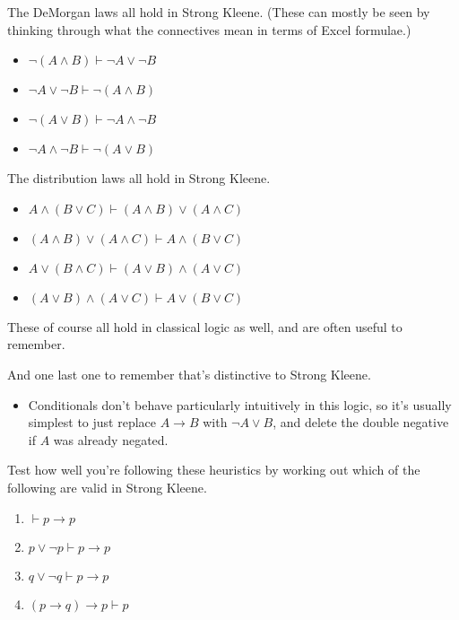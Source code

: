 \documentclass[
]{article}
\providecommand{\tightlist}{%
  \setlength{\itemsep}{0pt}\setlength{\parskip}{0pt}}\usepackage{longtable,booktabs,array}
\begin{document}
The DeMorgan laws all hold in Strong Kleene. (These can mostly be seen
by thinking through what the connectives mean in terms of Excel
formulae.)

\begin{itemize}
\tightlist
\item
  \(\neg (A \wedge B) \vdash \neg A \vee \neg B\)
\item
  \(\neg A \vee \neg B \vdash \neg (A \wedge B)\)
\item
  \(\neg (A \vee B) \vdash \neg A \wedge \neg B\)
\item
  \(\neg A \wedge \neg B \vdash \neg (A \vee B)\)
\end{itemize}

The distribution laws all hold in Strong Kleene.

\begin{itemize}
\tightlist
\item
  \(A \wedge (B \vee C) \vdash (A \wedge B) \vee (A \wedge C)\)
\item
  \((A \wedge B) \vee (A \wedge C) \vdash A \wedge (B \vee C)\)
\item
  \(A \vee (B \wedge C) \vdash (A \vee B) \wedge (A \vee C)\)
\item
  \((A \vee B) \wedge (A \vee C) \vdash A \vee (B \vee C)\)
\end{itemize}

These of course all hold in classical logic as well, and are often
useful to remember.

And one last one to remember that's distinctive to Strong Kleene.

\begin{itemize}
\tightlist
\item
  Conditionals don't behave particularly intuitively in this logic, so
  it's usually simplest to just replace \(A \rightarrow B\) with
  \(\neg A \vee B\), and delete the double negative if \(A\) was already
  negated.
\end{itemize}

Test how well you're following these heuristics by working out which of
the following are valid in Strong Kleene.

\begin{enumerate}
\def\labelenumi{\arabic{enumi}.}
\tightlist
\item
  \(\vdash p \rightarrow p\)
\item
  \(p \vee \neg p \vdash p \rightarrow p\)
\item
  \(q \vee \neg q \vdash p \rightarrow p\)
\item
  \((p \rightarrow q) \rightarrow p \vdash p\)
\end{enumerate}
\end{document}
